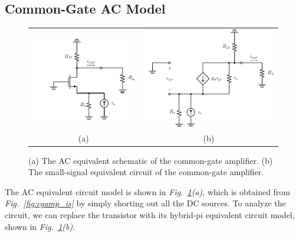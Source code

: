 \subsection{Common-Gate AC Model}
\begin{figure}[tb]
\centering
\begin{tabular}{cc}
\includegraphics[scale=.85]{cgamp_is_ac} &
\includegraphics[scale=.85]{cgamp_is_ac_ss}\\
(a) & (b)\\
\end{tabular}
\caption{(a) The AC equivalent schematic of the common-gate amplifier.  (b) The small-signal equivalent circuit of the common-gate amplifier.}
\label{fig:cgamp_is_ac}
\end{figure}
The AC equivalent circuit model is shown in \emph{Fig.~\ref{fig:cgamp_is_ac}(a)}, which is obtained from \emph{Fig.~\ref{fig:cgamp_is}} by simply shorting out all the DC sources.  To analyze the circuit, we can replace the transistor with its hybrid-pi equivalent circuit model, shown in \emph{Fig.~\ref{fig:cgamp_is_ac}(b)}.
